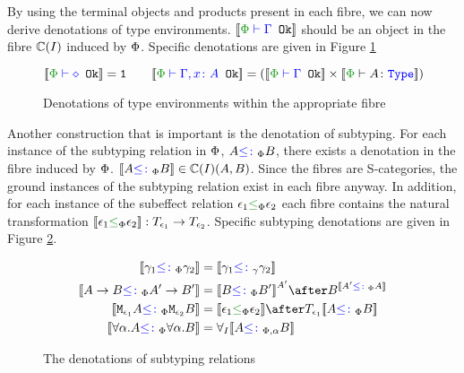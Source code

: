 \documentclass{Report}
\begin{document}
By using the terminal objects and products present in each fibre, we can now derive denotations of type environments. $\deno{\oke{\P}{\G}}$ should be an object in the fibre $\C(I)$ induced by $\P$. Specific denotations are given in Figure \ref{TypeEnvDenotations}

\begin{figure}[H]
    \centering
    \begin{framed}
        \[
            \deno{\wellformedok{\P}{\nil}} = \1
            \quad\quad
            \deno{\wellformedok{\P}{\gax}} = (\deno{\wellformedok{\P}{\G}} \times \deno{\typerelation{\P}{A}{\type}})
        \]  
    \end{framed}

    \caption{Denotations of type environments within the appropriate fibre}
    \label{TypeEnvDenotations}
\end{figure}


Another construction that is important is the denotation of subtyping. For each instance of the subtyping relation in $\P$, $A\subtypep B$, there exists a denotation in the fibre induced by $\P$. $\deno{A\subtypep B} \in\C(I)(A, B)$. Since the fibres are S-categories, the ground instances of the subtyping relation exist in each fibre anyway. In addition, for each instance of the subeffect relation $\e_1\subeffectp \e_2$ each fibre contains the natural transformation $\dsep{\e_1}{\e_2}: \T{\e_1}{}\rightarrow \T{\e_2}{}$. Specific subtyping denotations are given in Figure \ref{SubtypingDenotations}.

\begin{figure}[H]
    \centering
    \begin{framed}
        \begin{align*}
            \deno{\g_1\subtypep \g_2} &= \deno{\g_1\subtypeg \g_2}
            \\
            \deno{\ab \subtypep \fntype{A'}{B'}} &= \deno{B\subtypep B'}^{A'}\after B^{\deno{A'\subtypep A}}
            \\
            \deno{\M{\e_1}{A}\subtypep\M{\e_2}{B}} &= \deno{\e_1\subeffectp\e_2}\after\T{\e_1}{\deno{A\subtypep B}}
            \\
            \deno{\all{\a}{A}\subtypep\all{\a}{B}} &= \allI{\deno{A\subtypepa B}}
        \end{align*}
    \end{framed}
    
    \caption{The denotations of subtyping relations}
    \label{SubtypingDenotations}
\end{figure}
\end{document}

